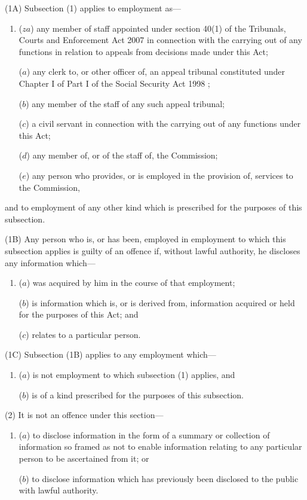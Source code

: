 \documentclass[12pt,a4paper]{article}
\begin{document}
(1A) Subsection (1) applies to employment as—
\begin{enumerate}\item[]
($za$) any member of staff appointed under section 40(1) of the Tribunals, Courts and Enforcement Act 2007 in connection with the carrying out of any functions in relation to appeals from decisions made under this Act;

($a$) any clerk to, or other officer of, an appeal tribunal
constituted under Chapter I of Part I of the Social Security Act 1998%
;

($b$) any member of the staff of 
any such  %
appeal tribunal;

($c$) a civil servant in connection with the carrying out of any functions under this Act;

($d$) any member of, or of the staff of, the Commission;

($e$) any person who provides, or is employed in the provision of, services to the Commission,
\end{enumerate}
and to employment of any other kind which is prescribed for the purposes of this subsection.

(1B) Any person who is, or has been, employed in employment to which this subsection applies is guilty of an offence if, without lawful authority, he discloses any information which—
\begin{enumerate}\item[]
($a$) was acquired by him in the course of that employment;

($b$) is information which is, or is derived from, information acquired or held for the purposes of this Act; and

($c$) relates to a particular person.
\end{enumerate}

(1C) Subsection (1B) applies to any employment which—
\begin{enumerate}\item[]
($a$) is not employment to which subsection (1) applies, and

($b$) is of a kind prescribed for the purposes of this subsection.
\end{enumerate}

(2) It is not an offence under this section—
\begin{enumerate}\item[]
($a$) to disclose information in the form of a summary or collection of information so framed as not to enable information relating to any particular person to be ascertained from it; or

($b$) to disclose information which has previously been disclosed to the public with lawful authority.
\end{enumerate}
\end{document}
